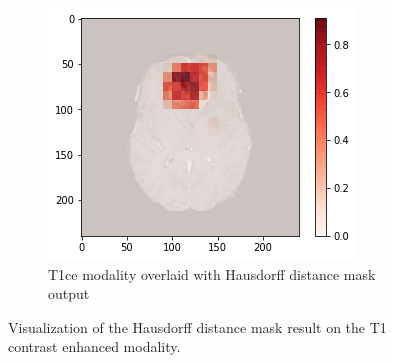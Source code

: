 \begin{figure}[H]
\begin{subfigure}{.33\textwidth}
    \end{subfigure}
        \begin{subfigure}{.33\textwidth}
        \centering
        \includegraphics[width=\linewidth]{chapters/07_brats3d/images/10_t1ce_hdm.png}
        \caption{T1ce modality overlaid with Hausdorff distance mask output}
    \end{subfigure}
    \caption{Visualization of the Hausdorff distance mask result on the T1 contrast enhanced modality.}
    \label{brats3d_t1ce}
\end{figure}

